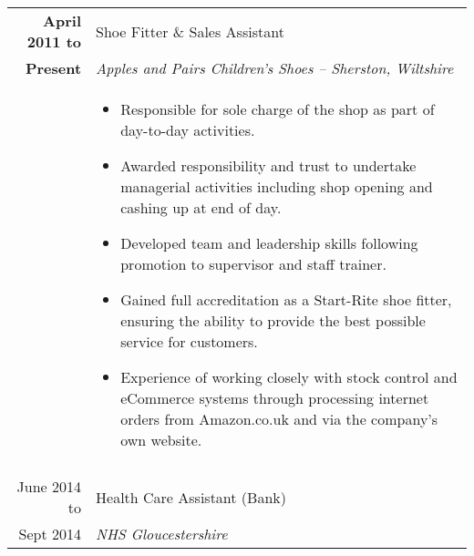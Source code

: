 \documentclass[a4paper, 10pt]{extarticle} %
\begin{document}
\begin{longtable}{r | p{13cm}}

			\textbf{April 2011 to}
		
		 & 
		 
		 Shoe Fitter \& Sales Assistant  \\
		 
			\textbf{Present}
		& 
		
		\textit{Apples and Pairs Children's Shoes – Sherston, Wiltshire} \\ 
		
& 

\footnotesize{

\vspace{-0.3cm}

\begin{itemize}[leftmargin=*]
\item Responsible for sole charge of the shop as part of day-to-day activities.

\item Awarded responsibility and trust to undertake managerial activities including shop opening and cashing up at end of day. 

\item Developed team and leadership skills following promotion to supervisor and staff trainer.  

\item Gained full accreditation as a Start-Rite shoe fitter, ensuring the ability to provide the best possible service for customers.

\item Experience of working closely with stock control and eCommerce systems through processing internet orders from Amazon.co.uk and via the company's own website. 

\vspace{-0.3cm}

\end{itemize}

} \\

\multicolumn{2}{c}{} \\

			June 2014 to
		
		 & 
		 
		 Health Care Assistant (Bank) \\
		 
			Sept 2014
		& 
		
		\textit{NHS Gloucestershire} \\ 
		

\end{longtable}
\end{document}
